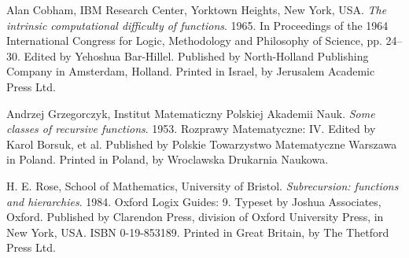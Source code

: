 \begin{thebibliography}{9} %


Alan Cobham, IBM Research Center, Yorktown Heights, New York, USA. \emph{The
intrinsic computational difficulty of functions}. 1965. In Proceedings of the
1964 International Congress for Logic, Methodology and Philosophy of Science,
pp. 24--30. Edited by Yehoshua Bar-Hillel. Published by North-Holland
Publishing Company in Amsterdam, Holland.  Printed in Israel, by Jerusalem
Academic Press Ltd.


Andrzej Grzegorczyk, Institut Matematiczny Polskiej Akademii Nauk. \emph{Some
classes of recursive functions}. 1953. Rozprawy Matematyczne: IV. Edited by
Karol Borsuk, et al. Published by Polskie Towarzystwo Matematyczne Warszawa in
Poland. Printed in Poland, by Wroclawska Drukarnia Naukowa.


H. E. Rose, School of Mathematics, University of Bristol. \emph{Subrecursion:
functions and hierarchies}. 1984. Oxford Logix Guides: 9. Typeset by Joshua
Associates, Oxford.  Published by Clarendon Press, division of Oxford
University Press, in New York, USA. ISBN 0-19-853189. Printed in Great Britain,
by The Thetford Press Ltd.

\end{thebibliography}
